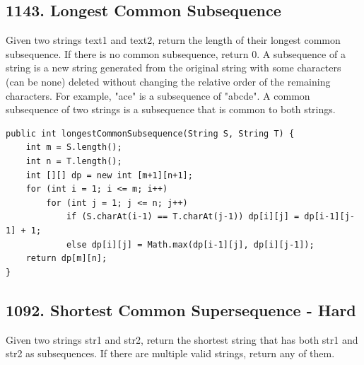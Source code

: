 \documentclass[9pt, b5paaper]{book}
\begin{document}
\subsection{1143. Longest Common Subsequence}
\label{sec-1-4-33}
Given two strings text1 and text2, return the length of their longest common subsequence. If there is no common subsequence, return 0.
A subsequence of a string is a new string generated from the original string with some characters (can be none) deleted without changing the relative order of the remaining characters.
For example, "ace" is a subsequence of "abcde".
A common subsequence of two strings is a subsequence that is common to both strings.
\begin{verbatim}
public int longestCommonSubsequence(String S, String T) {
    int m = S.length();
    int n = T.length();
    int [][] dp = new int [m+1][n+1];
    for (int i = 1; i <= m; i++) 
        for (int j = 1; j <= n; j++) 
            if (S.charAt(i-1) == T.charAt(j-1)) dp[i][j] = dp[i-1][j-1] + 1;
            else dp[i][j] = Math.max(dp[i-1][j], dp[i][j-1]);
    return dp[m][n];
}
\end{verbatim}

\subsection{1092. Shortest Common Supersequence - Hard}
\label{sec-1-4-34}
Given two strings str1 and str2, return the shortest string that has both str1 and str2 as subsequences. If there are multiple valid strings, return any of them.
\end{document}
